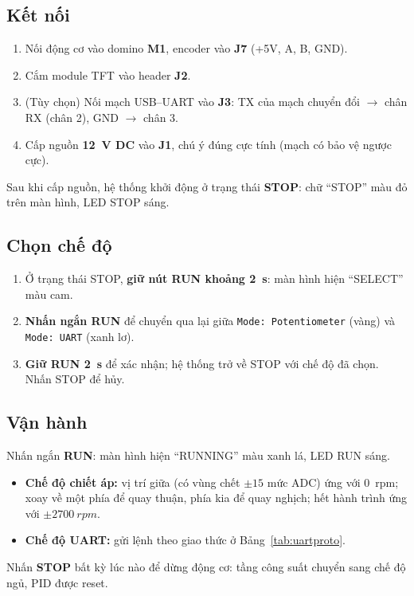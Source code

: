 \subsection{Kết nối}
\begin{enumerate}
  \item Nối động cơ vào domino \textbf{M1}, encoder vào \textbf{J7} (+5V, A, B, GND).
  \item Cắm module TFT vào header \textbf{J2}.
  \item (Tùy chọn) Nối mạch USB--UART vào \textbf{J3}: TX của mạch chuyển đổi $\to$ chân RX (chân 2), GND $\to$ chân 3.
  \item Cấp nguồn \textbf{\SI{12}{\volt} DC} vào \textbf{J1}, chú ý đúng cực tính (mạch có bảo vệ ngược cực).
\end{enumerate}
Sau khi cấp nguồn, hệ thống khởi động ở trạng thái \textbf{STOP}: chữ ``STOP'' màu đỏ trên màn hình, LED STOP sáng.

\subsection{Chọn chế độ}
\begin{enumerate}
  \item Ở trạng thái STOP, \textbf{giữ nút RUN khoảng \SI{2}{\second}}: màn hình hiện ``SELECT'' màu cam.
  \item \textbf{Nhấn ngắn RUN} để chuyển qua lại giữa \texttt{Mode: Potentiometer} (vàng) và \texttt{Mode: UART} (xanh lơ).
  \item \textbf{Giữ RUN \SI{2}{\second}} để xác nhận; hệ thống trở về STOP với chế độ đã chọn. Nhấn STOP để hủy.
\end{enumerate}

\subsection{Vận hành}
Nhấn ngắn \textbf{RUN}: màn hình hiện ``RUNNING'' màu xanh lá, LED RUN sáng.
\begin{itemize}
  \item \textbf{Chế độ chiết áp:} vị trí giữa (có vùng chết $\pm15$ mức ADC) ứng với \SI{0}{rpm}; xoay về một phía để quay thuận, phía kia để quay nghịch; hết hành trình ứng với $\pm\SI{2700}{rpm}$.
  \item \textbf{Chế độ UART:} gửi lệnh theo giao thức ở Bảng~\ref{tab:uartproto}.
\end{itemize}
Nhấn \textbf{STOP} bất kỳ lúc nào để dừng động cơ: tầng công suất chuyển sang chế độ ngủ, PID được reset.

